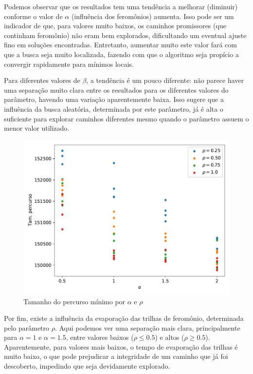 \documentclass{article}
\begin{document}
Podemos observar que os resultados tem uma tendência a melhorar (diminuir) conforme o valor de $\alpha$ (influência dos feromônios) aumenta. Isso pode ser um indicador de que, para valores muito baixos, os caminhos promissores (que continham feromônio) não eram bem explorados, dificultando um eventual ajuste fino em soluções encontradas. Entretanto, aumentar muito este valor fará com que a busca seja muito localizada, fazendo com que o algoritmo seja propício a convergir rapidamente para mínimos locais.

Para diferentes valores de $\beta$, a tendência é um pouco diferente: não parece haver uma separação muito clara entre os resultados para os diferentes valores do parâmetro, havendo uma variação aparentemente baixa. Isso sugere que a influência da busca aleatória, determinada por este parâmetro, já é alta o suficiente para explorar caminhos diferentes mesmo quando o parâmetro assuem o menor valor utilizado.

\begin{figure}[htbp!]
  \centering
  \includegraphics[scale=0.8]{rho.pdf}
  \caption{Tamanho do percurso mínimo por $\alpha$ e $\rho$}
  \label{fig:rho}
\end{figure}

Por fim, existe a influência da evaporação das trilhas de feromônio, determinada pelo parâmetro $\rho$. Aqui podemos ver uma separação mais clara, principalmente para $\alpha = 1$ e $\alpha = 1.5$, entre valores baixos ($\rho \leq 0.5$) e altos ($\rho \geq 0.5$). Aparentemente, para valores mais baixos, o tempo de evaporação das trilhas é muito baixo, o que pode prejudicar a integridade de um caminho que já foi descoberto, impedindo que seja devidamente explorado.
\end{document}
